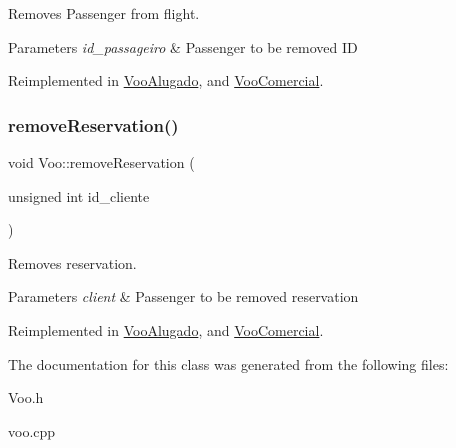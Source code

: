Removes Passenger from flight. 


\begin{DoxyParams}{Parameters}
{\em id\+\_\+passageiro} & Passenger to be removed ID \\
\hline
\end{DoxyParams}


Reimplemented in \hyperlink{class_voo_alugado_aaf46e034bb4655c62b432f9669a7ed65}{Voo\+Alugado}, and \hyperlink{class_voo_comercial_a7e9904d20f1dc6908d98d7ccebd1fbb2}{Voo\+Comercial}.

\mbox{\label{class_voo_ab9b59a39248b92a5f106800117436d90}} 
\subsubsection{\texorpdfstring{remove\+Reservation()}{removeReservation()}}
{\footnotesize\ttfamily void Voo\+::remove\+Reservation (\begin{DoxyParamCaption}\item[{unsigned int}]{id\+\_\+cliente }\end{DoxyParamCaption})\hspace{0.3cm}{\ttfamily [virtual]}}



Removes reservation. 


\begin{DoxyParams}{Parameters}
{\em client} & Passenger to be removed reservation \\
\hline
\end{DoxyParams}


Reimplemented in \hyperlink{class_voo_alugado_afcd0ae78d182121fe1a6c010dbeca60d}{Voo\+Alugado}, and \hyperlink{class_voo_comercial_ab5aed9e0ee7812f186c62ac1f98d7671}{Voo\+Comercial}.



The documentation for this class was generated from the following files\+:\begin{DoxyCompactItemize}
\item 
Voo.\+h\item 
voo.\+cpp\end{DoxyCompactItemize}
